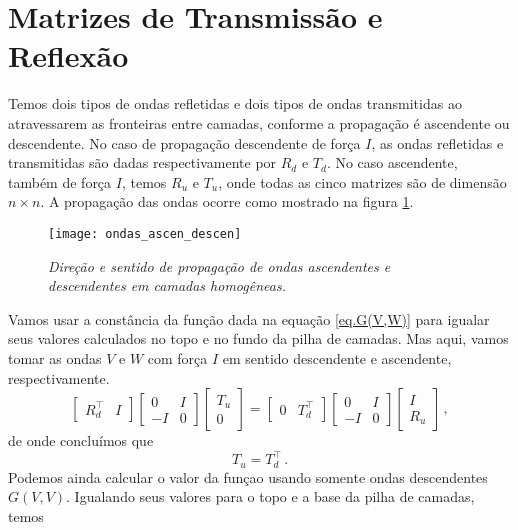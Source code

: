 \section{Matrizes de Transmiss\~ao e Reflex\~ao}
Temos dois tipos de ondas refletidas e dois tipos de ondas transmitidas ao atravessarem as fronteiras entre camadas, conforme a propaga\c{c}\~ao \'e ascendente ou descendente. No caso de propaga\c{c}\~ao descendente de for\c{c}a $I$, as ondas refletidas e transmitidas s\~ao dadas respectivamente por $R_d$ e $T_d$. No caso ascendente, tamb\'em de for\c{c}a $I$, temos $R_u$ e $T_u$, onde todas as cinco matrizes s\~ao de dimens\~ao $n\times n$. A propaga\c{c}\~ao das ondas ocorre como mostrado na figura \ref{fig.ondas_ascen_descen}.
\begin{figure}
\centering
\texttt{[image: ondas\_ascen\_descen]}
\caption{\textit{Dire\c{c}\~ao e sentido de propaga\c{c}\~ao de ondas ascendentes e descendentes em camadas homog\^eneas.}}
\label{fig.ondas_ascen_descen}
\end{figure}
Vamos usar a const\^ancia da fun\c{c}\~ao dada na equa\c{c}\~ao \ref{eq.G(V,W)} para igualar seus valores calculados no topo e no fundo da pilha de camadas. Mas aqui, vamos tomar as ondas $V$ e $W$ com for\c{c}a $I$ em sentido descendente e ascendente, respectivamente.  
\begin{equation}
\begin{bmatrix}
R_d^\top&I
\end{bmatrix}
\begin{bmatrix}
0&I\\
-I&0
\end{bmatrix}
\begin{bmatrix}
T_u\\
0
\end{bmatrix}
=
\begin{bmatrix}
0&T_d^\top
\end{bmatrix}
\begin{bmatrix}
0&I\\
-I&0
\end{bmatrix}
\begin{bmatrix}
I\\
R_u
\end{bmatrix}\,,
\end{equation}
de onde conclu\'imos que
\begin{equation}\label{eq.T}
T_u=T_d^\top\,.
\end{equation}
Podemos ainda calcular o valor da fun\c{c}ao usando somente ondas descendentes $G(V,V)$. Igualando seus valores para o topo e a base da pilha de camadas, temos

